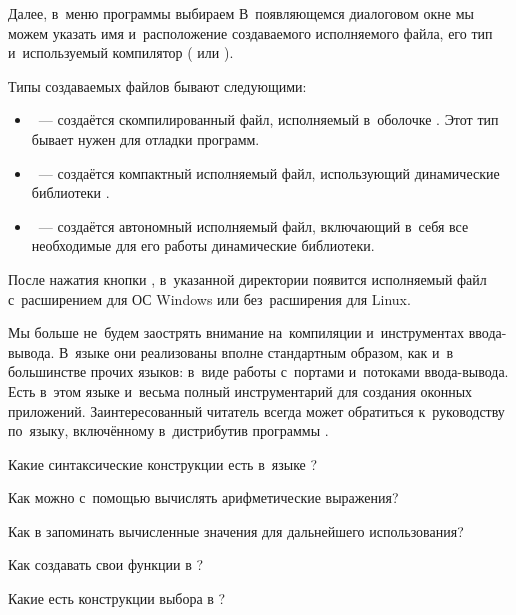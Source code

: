 Далее, в~меню программы  выбираем  В~появляющемся диалоговом окне мы можем указать имя и~расположение создаваемого исполняемого файла, его тип и~используемый компилятор ( или ).

Типы создаваемых файлов бывают следующими:

\begin{itemize}[--]
 \item {}~--- создаётся скомпилированный файл, исполняемый в~оболочке . Этот тип бывает нужен для отладки программ.

 \item {}~--- создаётся компактный исполняемый файл, использующий динамические библиотеки .

 \item {}~--- создаётся автономный исполняемый файл, включающий в~себя все необходимые для его работы динамические библиотеки.
\end{itemize}

После нажатия кнопки , в~указанной директории появится исполняемый файл с~расширением  для ОС Windows или без~расширения для Linux.

Мы больше не~будем заострять внимание на~компиляции и~инструментах ввода-вывода. В~языке \Scheme они реализованы вполне стандартным образом, как и~в большинстве прочих языков: в~виде работы с~портами и~потоками ввода-вывода. Есть в~этом языке и~весьма полный инструментарий для создания оконных приложений. Заинтересованный читатель всегда может обратиться к~руководству по~языку, включённому в~дистрибутив программы .

\begin{Queeze}
 \item Какие синтаксические конструкции есть в~языке \Scheme?

 \item Как можно с~помощью \Scheme вычислять арифметические выражения?

 \item Как в \Scheme запоминать вычисленные значения для дальнейшего использования?

 \item Как создавать свои функции в \Scheme?

 \item Какие есть конструкции выбора в \Scheme?
\end{Queeze}
